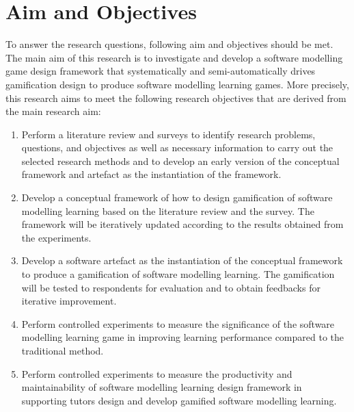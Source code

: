 \documentclass[12pt, a4paper]{report}
\begin{document}
\section{Aim and Objectives}
To answer the research questions, following aim and objectives should be met. The main aim of this research is to investigate and develop a software modelling game design framework that systematically and semi-automatically drives gamification design to produce software modelling learning games. More precisely, this research aims to meet the following research objectives that are derived from the main research aim:

\begin{enumerate}
\item Perform a literature review and surveys to identify research problems, questions, and objectives as well as necessary information to carry out the selected research methods and to develop an early version of the conceptual framework and artefact as the instantiation of the framework. 
\item Develop a conceptual framework of how to design gamification of software modelling learning based on the literature review and the survey. The framework will be iteratively updated according to the results obtained from the experiments. 
\item Develop a software artefact as the instantiation of the conceptual framework to produce a gamification of software modelling learning. The gamification will be tested to respondents for evaluation and to obtain feedbacks for iterative improvement. 
\item Perform controlled experiments to measure the significance of the software modelling learning game in improving learning performance compared to the traditional method.
\item Perform controlled experiments to measure the productivity and maintainability of software modelling learning design framework in supporting tutors design and develop gamified software modelling learning. 
\end{enumerate}
\end{document}
